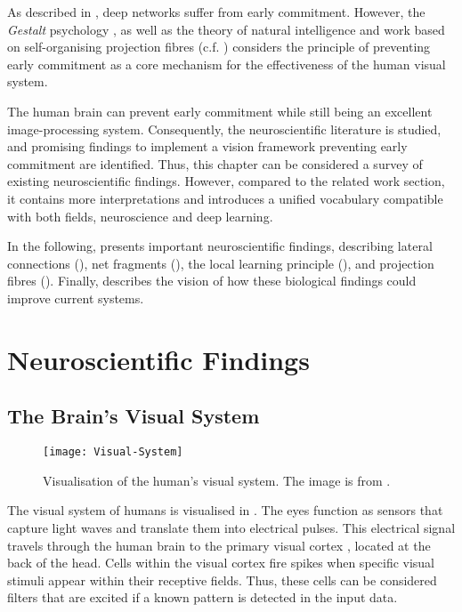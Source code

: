 As described in , deep networks suffer from early commitment.
However, the \emph{Gestalt} psychology \cite{ellis_source_1938, kohler_gestalt_1992, wagemans_century_2012, hamlyn_psychology_2017}, as well as the theory of natural intelligence \cite{von_der_malsburg_theory_2022} and work based on self-organising projection fibres (c.f. ) considers the principle of preventing early commitment as a core mechanism for the effectiveness of the human visual system.

The human brain can prevent early commitment while still being an excellent image-processing system. 
Consequently, the neuroscientific literature is studied, and promising findings to implement a vision framework preventing early commitment are identified.
Thus, this chapter can be considered a survey of existing neuroscientific findings.
However, compared to the related work section, it contains more interpretations and introduces a unified vocabulary compatible with both fields, neuroscience and deep learning.

In the following,  presents important neuroscientific findings, describing lateral connections (), net fragments (), the local learning principle (), and projection fibres ().
Finally,  describes the vision of how these biological findings could improve current systems.



\section{Neuroscientific Findings}

\subsection{The Brain's Visual System}
\begin{figure}[h]
    \centering
    \texttt{[image: Visual-System]}
    \caption[Visualisation of the human's visual system]{Visualisation of the human's visual system. The image is from .}
\end{figure}
%
The visual system of humans is visualised in . The eyes function as sensors that capture light waves and translate them into electrical pulses. This electrical signal travels through the human brain to the primary visual cortex , located at the back of the head.
Cells within the visual cortex fire spikes when specific visual stimuli appear within their receptive fields. Thus, these cells can be considered filters that are excited if a known pattern is detected in the input data. 

